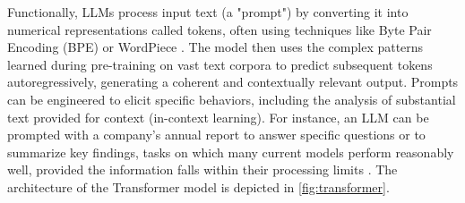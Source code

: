 Functionally, LLMs process input text (a "prompt") by converting it into numerical representations called tokens, often using techniques like Byte Pair Encoding (BPE) or WordPiece \parencite{RefWorks:RefID:103-schmidt2024tokenization}. The model then uses the complex patterns learned during pre-training on vast text corpora to predict subsequent tokens autoregressively, generating a coherent and contextually relevant output. Prompts can be engineered to elicit specific behaviors, including the analysis of substantial text provided for context (in-context learning). For instance, an LLM can be prompted with a company's annual report to answer specific questions or to summarize key findings, tasks on which many current models perform reasonably well, provided the information falls within their processing limits \parencite{RefWorks:RefID:96-rzepka2023expert}. The architecture of the Transformer model is depicted in \cref{fig:transformer}.
